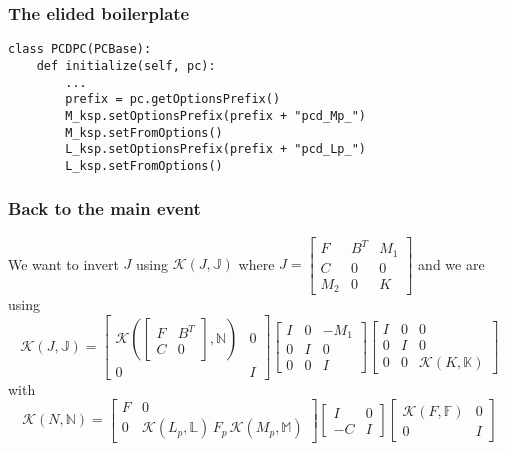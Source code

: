 \documentclass[presentation]{beamer}
\newcommand{\KSP}[2]{\ensuremath{\mathcal{K}\left(#1, \mathbb{#2}\right)}}
\newcommand{\ksp}[1]{\KSP{#1}{#1}}
\begin{document}
\begin{frame}[fragile]
  \frametitle{The elided boilerplate}
\begin{verbatim}
class PCDPC(PCBase):
    def initialize(self, pc):
        ...
        prefix = pc.getOptionsPrefix()
        M_ksp.setOptionsPrefix(prefix + "pcd_Mp_")
        M_ksp.setFromOptions()
        L_ksp.setOptionsPrefix(prefix + "pcd_Lp_")
        L_ksp.setFromOptions()
\end{verbatim}
\end{frame}

\begin{frame}
  \frametitle{Back to the main event}
  We want to invert $J$ using $\ksp{J}$ where
  $J = \begin{bmatrix}
    F & B^T & M_1\\
    C & 0 & 0 \\
    M_2 & 0 & K
  \end{bmatrix}$
  and we are using
  \begin{equation*}
    \ksp{J} =
    \begin{bmatrix}
      \KSP{\begin{bmatrix}
        F & B^T\\
        C & 0
      \end{bmatrix}}{N} & 0\\
    0 & I
  \end{bmatrix}
  \begin{bmatrix}
    I & 0 & -M_1\\
    0 & I & 0 \\
    0 & 0 & I
  \end{bmatrix}
  \begin{bmatrix}
    I & 0 & 0\\
    0 & I & 0\\
    0 & 0 &\ksp{K}
  \end{bmatrix}
\end{equation*}
with
\begin{equation*}
    \ksp{N} = \begin{bmatrix}
      F & 0 \\
      0 & \KSP{L_p}{L}\,F_p \, \KSP{M_p}{M}
    \end{bmatrix}
    \begin{bmatrix}
      I & 0\\
      -C & I
    \end{bmatrix}
    \begin{bmatrix}
      \ksp{F} & 0 \\
      0 & I
    \end{bmatrix}
\end{equation*}
\end{frame}
\end{document}
